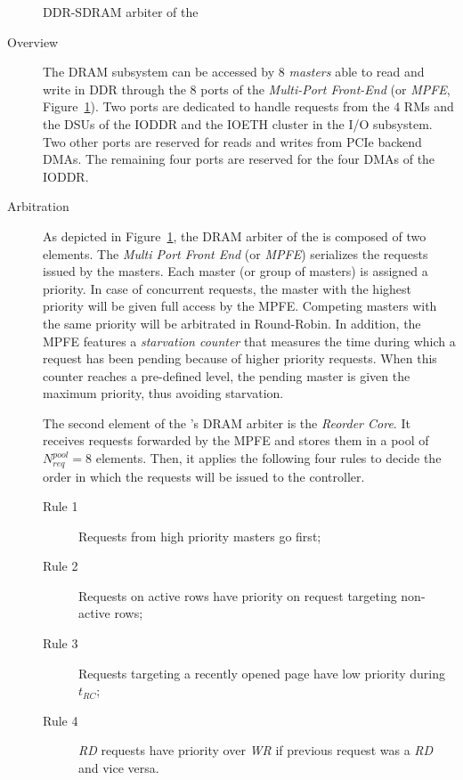 \documentclass[main.tex]{subfiles}
\begin{document}
\begin{figure}
    \centering
    \scalebox{0.8}{}
    \caption{DDR-SDRAM arbiter of the \mppalong}
    \label{fig_execModel_MPPADRAMarbiter}
\end{figure}
\begin{description}
    \item[Overview]
        The DRAM subsystem can be accessed by 8 \emph{masters} able to read and
        write in DDR through the 8 ports of the \emph{Multi-Port Front-End} (or
        \emph{MPFE}, Figure~\ref{fig_execModel_MPPADRAMarbiter}). Two ports are
        dedicated to handle requests from the 4 RMs and the DSUs of the IODDR
        and the IOETH cluster in the I/O subsystem. Two other ports are
        reserved for reads and writes from PCIe backend DMAs. The remaining
        four ports are reserved for the four DMAs of the IODDR.
    \item[Arbitration]
        As depicted in Figure~\ref{fig_execModel_MPPADRAMarbiter}, the DRAM
        arbiter of the \mppalong is composed of two elements. The \emph{Multi
        Port Front End} (or \emph{MPFE}) serializes the requests issued by the
        masters. Each master (or group of masters) is assigned a priority. In
        case of concurrent requests, the master with the highest priority will
        be given full access by the MPFE. Competing masters with the same
        priority will be arbitrated in Round-Robin. In addition, the MPFE
        features a \emph{starvation counter} that measures the time during
        which a request has been pending because of higher priority requests.
        When this counter reaches a pre-defined level, the pending master is
        given the maximum priority, thus avoiding starvation.

        The second element of the \mppalong's DRAM arbiter is the \emph{Reorder
        Core}. It receives requests forwarded by the MPFE and stores them in a
        pool of $N_{req}^{pool}=8$ elements. Then, it applies the following
        four rules to decide the order in which the requests will be issued to
        the controller.

        \begin{description}
            \item[Rule 1] Requests from high priority masters go first;
            \item[Rule 2] Requests on active rows have priority on request
                targeting non-active rows;
            \item[Rule 3] Requests targeting a recently opened page have low
                priority during $t_{RC}$;
            \item[Rule 4] \emph{RD} requests have priority over \emph{WR} if
                previous request was a \emph{RD} and vice versa. 
        \end{description}


\end{description}
\end{document}
